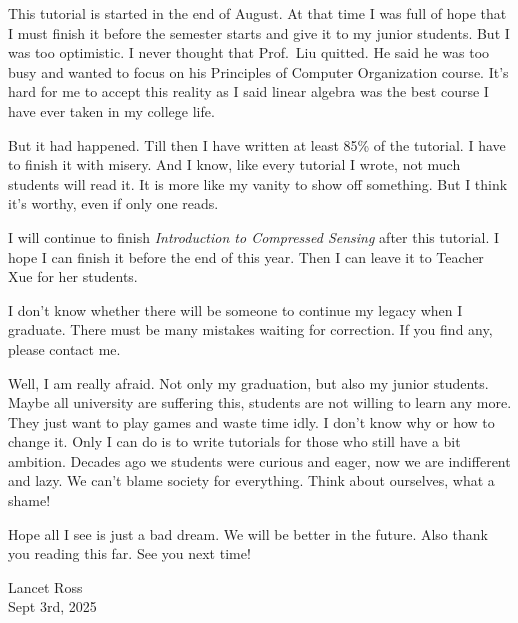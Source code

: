 \documentclass[10pt,a4paper,oneside,numbers=noenddot]{scrbook}
\theoremstyle{ctplain}
\theoremstyle{ctresult}
\begin{document}
This tutorial is started in the end of August. At that time I was full of hope that I must
finish it before the semester starts and give it to my junior students. But I was too
optimistic. I never thought that Prof.\ Liu quitted. He said he was too busy and wanted to
focus on his Principles of Computer Organization course. It's hard for me to accept this
reality as I said linear algebra was the best course I have ever taken in my college life.

But it had happened. Till then I have written at least 85\% of the tutorial. I have to finish
it with misery. And I know, like every tutorial I wrote, not much students will read it.
It is more like my vanity to show off something. But I think it's worthy, even if only one
reads.

I will continue to finish \textit{Introduction to Compressed Sensing} after this tutorial.
I hope I can finish it before the end of this year. Then I can leave it to Teacher Xue for
her students.

I don't know whether there will be someone to continue my legacy when I graduate. There must
be many mistakes waiting for correction. If you find any, please contact me.

Well, I am really afraid. Not only my graduation, but also my junior students. Maybe all
university are suffering this, students are not willing to learn any more. They just want to
play games and waste time idly. I don't know why or how to change it. Only I can do is to
write tutorials for those who still have a bit ambition. Decades ago we students were
curious and eager, now we are indifferent and lazy. We can't blame society for everything.
Think about ourselves, what a shame!

Hope all I see is just a bad dream. We will be better in the future. Also thank you reading
this far. See you next time!

\begin{flushright}
  Lancet Ross \\
  Sept 3rd, 2025
\end{flushright}
\end{document}
